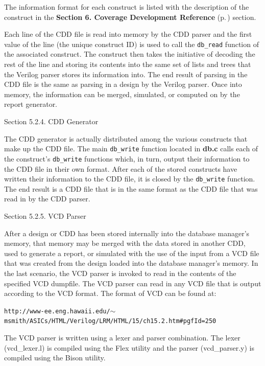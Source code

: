  The information format for each construct is listed with the description of the construct in the {\bf Section 6.  Coverage Development Reference} {\rm (p.\,\pageref{page_code_details})} section.

 Each line of the CDD file is read into memory by the CDD parser and the first value of the line (the unique construct ID) is used to call the {\tt db\_\-read} function of the associated construct. The construct then takes the initiative of decoding the rest of the line and storing its contents into the same set of lists and trees that the Verilog parser stores its information into. The end result of parsing in the CDD file is the same as parsing in a design by the Verilog parser. Once into memory, the information can be merged, simulated, or computed on by the report generator.



\begin{Desc}
\item[Section 5.2.4.  CDD Generator]\par
 The CDD generator is actually distributed among the various constructs that make up the CDD file. The main {\tt db\_\-write} function located in {\bf db.c} calls each of the construct's {\tt db\_\-write} functions which, in turn, output their information to the CDD file in their own format. After each of the stored constructs have written their information to the CDD file, it is closed by the {\tt db\_\-write} function. The end result is a CDD file that is in the same format as the CDD file that was read in by the CDD parser.\end{Desc}


\begin{Desc}
\item[Section 5.2.5.  VCD Parser]\par
 After a design or CDD has been stored internally into the database manager's memory, that memory may be merged with the data stored in another CDD, used to generate a report, or simulated with the use of the input from a VCD file that was created from the design loaded into the database manager's memory. In the last scenario, the VCD parser is invoked to read in the contents of the specified VCD dumpfile. The VCD parser can read in any VCD file that is output according to the VCD format. The format of VCD can be found at:

 {\tt http://www-ee.eng.hawaii.edu/$\sim$msmith/ASICs/HTML/Verilog/LRM/HTML/15/ch15.2.htm\#pgf\-Id=250}

 The VCD parser is written using a lexer and parser combination. The lexer (vcd\_\-lexer.l) is compiled using the Flex utility and the parser (vcd\_\-parser.y) is compiled using the  Bison utility.\end{Desc}


